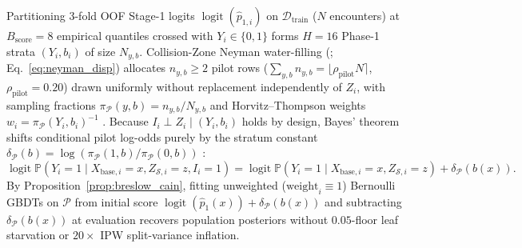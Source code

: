 \documentclass[11pt]{article}
\theoremstyle{remark}
\begin{document}
Partitioning $3$-fold OOF Stage-1 logits $\operatorname{logit}(\hat{p}_{1,i})$ on $\mathcal{D}_{\text{train}}$ ($N$ encounters) at $B_{\text{score}}=8$ empirical quantiles crossed with $Y_i \in \{0,1\}$ forms $H = 16$ Phase-1 strata $(Y_i, b_i)$ of size $N_{y,b}$. Collision-Zone Neyman water-filling (\citealp{tao2020optimal,satz2026collision}; Eq.~\eqref{eq:neyman_disp}) allocates $n_{y,b} \ge 2$ pilot rows ($\sum_{y,b} n_{y,b} = \lfloor \rho_{\text{pilot}} N \rceil$, $\rho_{\text{pilot}}=0.20$) drawn uniformly without replacement independently of $Z_i$, with sampling fractions $\pi_{\mathcal{P}}(y,b) = n_{y,b}/N_{y,b}$ and Horvitz--Thompson weights $w_i = \pi_{\mathcal{P}}(Y_i, b_i)^{-1}$ \citep{horvitz1952generalization,lumley2010complex}. Because $I_i \perp Z_i \mid (Y_i, b_i)$ holds by design, Bayes' theorem shifts conditional pilot log-odds purely by the stratum constant $\delta_{\mathcal{P}}(b) = \log(\pi_{\mathcal{P}}(1,b)/\pi_{\mathcal{P}}(0,b))$ \citep{breslow1988logistic}:
\begin{equation}
  \operatorname{logit}\mathbb{P}(Y_i = 1 \mid X_{\text{base},i} = x, Z_{\mathcal{S},i} = z, I_i = 1) = \operatorname{logit}\mathbb{P}(Y_i = 1 \mid X_{\text{base},i} = x, Z_{\mathcal{S},i} = z) + \delta_{\mathcal{P}}(b(x)).
  \label{eq:bc_shift}
\end{equation}
By Proposition~\ref{prop:breslow_cain}, fitting unweighted ($\text{weight}_i \equiv 1$) Bernoulli GBDTs on $\mathcal{P}$ from initial score $\operatorname{logit}(\hat{p}_1(x)) + \delta_{\mathcal{P}}(b(x))$ and subtracting $\delta_{\mathcal{P}}(b(x))$ at evaluation recovers population posteriors without $0.05$-floor leaf starvation or $20\times$ IPW split-variance inflation.
\end{document}
